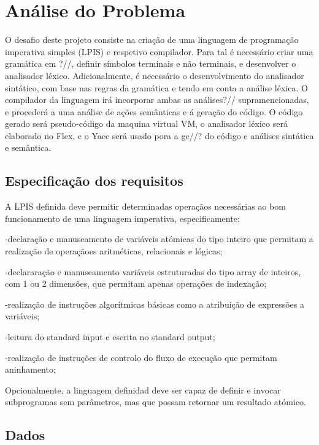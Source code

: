 \chapter{Análise do Problema}
\label{cap:analise}

O desafio deste projeto consiste na criação de uma linguagem de programação imperativa simples (LPIS) e respetivo compilador.
Para tal é necessário criar uma gramática em ?//, definir símbolos terminais e não terminais, e desenvolver o analisador léxico. Adicionalmente, é necessário o desenvolvimento do analisador sintático, com base nas regras da gramática e tendo em conta a análise léxica. O compilador da linguagem irá incorporar ambas as análises?// supramencionadas, e procederá a uma análise de ações semânticas e á geração do código. 
O código gerado será pseudo-código da maquina virtual VM, o analisador léxico será elaborado no Flex, e o Yacc será usado pora a ge//? do código e análises sintática e semântica.   


\section{Especificação dos requisitos}
\label{sec:especificacao:analise}

A LPIS definida deve permitir determinadas operaçãos necessárias ao bom funcionamento de uma linguagem imperativa, especificamente:

-declaração e manuseamento de variáveis atómicas do tipo inteiro que permitam a realização de operaçãoes aritméticas, relacionais e lógicas;

-declararação e manuseamento variáveis estruturadas do tipo array de inteiros, com 1 ou 2 dimensões, que permitam apenas operações de indexação;

-realização de instruções algorítmicas básicas como a atribuição de expressões a variáveis;

-leitura do standard input e escrita no standard output;

-realização de instruções de controlo do fluxo de execução que permitam aninhamento;

Opcionalmente, a linguagem definidad deve ser capaz de definir e invocar subprogramas sem parâmetros, mas que possam retornar um resultado atómico.


\section{Dados}
\label{sec:dados:analise}


